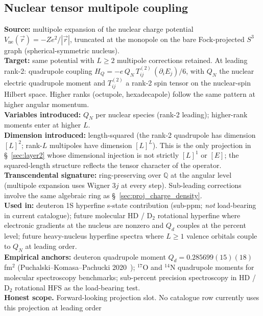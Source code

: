 \documentclass[11pt]{article}
\begin{document}
\subsection{Nuclear tensor multipole coupling}
\label{sec:proj_tensor_multipole}
\textbf{Source:} multipole expansion of the nuclear charge potential
$V_\text{ne}(\vec{r}) = -Ze^2/|\vec{r}|$, truncated at the
monopole on the bare Fock-projected $S^3$ graph (spherical-symmetric
nucleus).\\
\textbf{Target:} same potential with $L \geq 2$ multipole
corrections retained.  At leading rank-2: quadrupole coupling
$H_Q = -e\,Q_N\,T^{(2)}_{ij}\,(\partial_i E_j)/6$, with $Q_N$ the
nuclear electric quadrupole moment and $T^{(2)}_{ij}$ a rank-2
spin tensor on the nuclear-spin Hilbert space.  Higher ranks
(octupole, hexadecapole) follow the same pattern at higher angular
momentum.\\
\textbf{Variables introduced:} $Q_N$ per nuclear species (rank-2
leading); higher-rank moments enter at higher $L$.\\
\textbf{Dimension introduced:} length-squared (the rank-2
quadrupole has dimension $[L]^2$; rank-$L$ multipoles have dimension
$[L]^L$).  This is the only projection in \S~\ref{sec:layer2} whose
dimensional injection is not strictly $[L]^1$ or $[E]$; the
squared-length structure reflects the tensor character of the
operator.\\
\textbf{Transcendental signature:} ring-preserving over $\mathbb{Q}$
at the angular level (multipole expansion uses Wigner $3j$ at every
step).  Sub-leading corrections involve the same algebraic ring as
\S~\ref{sec:proj_charge_density}.\\
\textbf{Used in:} deuteron 1S hyperfine s-state contribution
(sub-ppm; \emph{not} load-bearing in current catalogue); future
molecular HD / D$_2$ rotational hyperfine where electronic
gradients at the nucleus are nonzero and $Q_d$ couples at the
percent level;
future heavy-nucleus hyperfine spectra where $L \geq 1$ valence
orbitals couple to $Q_N$ at leading order.\\
\textbf{Empirical anchors:} deuteron quadrupole moment
$Q_d = 0.285699(15)(18)$ fm$^2$ (Puchalski--Komasa--Pachucki 2020~\cite{puchalski_komasa_pachucki2020}); $^{17}$O
and $^{14}$N quadrupole moments for molecular spectroscopy
benchmarks; sub-percent precision spectroscopy in HD / D$_2$
rotational HFS as the load-bearing test.\\
\textbf{Honest scope.}  Forward-looking projection slot.  No
catalogue row currently uses this projection at leading order
\end{document}
